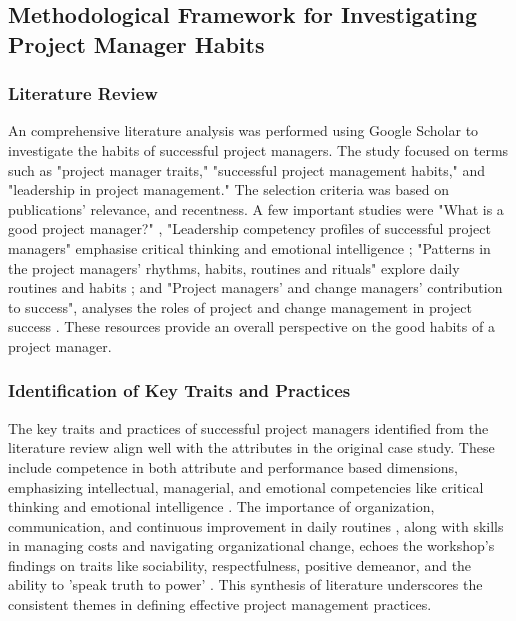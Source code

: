 \documentclass{article}
\begin{document}
\subsection{Methodological Framework for Investigating Project Manager Habits}

\subsubsection{Literature Review}

An comprehensive literature analysis was performed using Google Scholar to investigate the habits of successful project managers. The study focused on terms such as "project manager traits," "successful project management habits," and "leadership in project management." The selection criteria was based on publications' relevance, and recentness. A few important studies were "What is a good project manager?" \cite{bredillet2015good}, "Leadership competency profiles of successful project managers" emphasise critical thinking and emotional intelligence \cite{muller2010leadership}; "Patterns in the project managers’ rhythms, habits, routines and rituals" explore daily routines and habits \cite{sigurdhssonpatterns}; and "Project managers’ and change managers’ contribution to success", analyses the roles of project and change management in project success \cite{pollack2016project}. These resources provide an overall perspective on the good habits of a project manager.

\subsubsection{Identification of Key Traits and Practices} 

The key traits and practices of successful project managers identified from the literature review align well with the attributes in the original case study. These include competence in both attribute and performance based dimensions, emphasizing intellectual, managerial, and emotional competencies like critical thinking and emotional intelligence \cite{muller2010leadership}. The importance of organization, communication, and continuous improvement in daily routines \cite{sigurdhssonpatterns}, along with skills in managing costs and navigating organizational change, echoes the workshop's findings on traits like sociability, respectfulness, positive demeanor, and the ability to 'speak truth to power' \cite{bredillet2015good}. This synthesis of literature underscores the consistent themes in defining effective project management practices.
\end{document}
